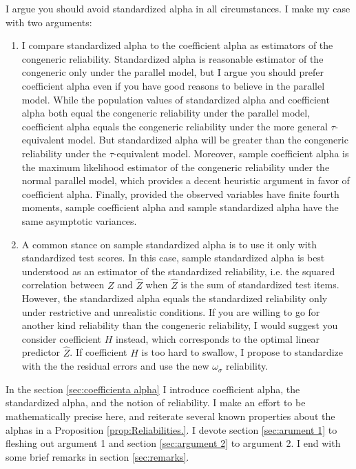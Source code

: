 \documentclass{article}
\theoremstyle{plain}
\theoremstyle{plain}
\theoremstyle{definition}
\theoremstyle{remark}
\theoremstyle{definition}
\theoremstyle{plain}
\theoremstyle{plain}
\theoremstyle{definition}
\begin{document}
I argue you should avoid standardized alpha in all circumstances. I make my case with two arguments:

\begin{enumerate}[label=\arabic*.]
\item I compare standardized alpha to the coefficient alpha as estimators of the congeneric reliability. Standardized alpha is reasonable estimator of the congeneric only under the parallel model, but I argue you should prefer coefficient alpha even if you have good reasons to believe in the parallel model. While the population values of standardized alpha and coefficient alpha both equal the congeneric reliability under the parallel model, coefficient alpha equals the congeneric reliability under the more general $\tau$-equivalent model. But standardized alpha will be greater than the congeneric reliability under the $\tau$-equivalent model. Moreover, sample coefficient alpha is the maximum likelihood estimator of the congeneric reliability under the normal parallel model, which provides a decent heuristic argument in favor of coefficient alpha. Finally, provided the observed variables have finite fourth moments, sample coefficient alpha and sample standardized alpha have the same asymptotic variances. 

\item A common stance on sample standardized alpha is to use it only with standardized test scores. In this case, sample standardized alpha is best understood as an estimator of the standardized reliability, i.e. the squared correlation between $Z$ and $\hat{Z}$ when $\hat{Z}$ is the sum of standardized test items. However, the standardized alpha equals the standardized reliability only under restrictive and unrealistic conditions. If you are willing to go for another kind reliability than the congeneric reliability, I would suggest you consider coefficient $H$ instead, which corresponds to the optimal linear predictor $\hat{Z}$. If coefficient $H$ is too hard to swallow, I propose to standardize with the the residual errors and use the new $\omega_\sigma$ reliability.
\end{enumerate}

In the section \ref{sec:coefficienta alpha} I introduce coefficient alpha, the standardized alpha, and the notion of reliability. I make an effort to be mathematically precise here, and reiterate several known properties about the alphas in a Proposition \ref{prop:Reliabilities.}. I devote section \ref{sec:arument 1} to fleshing out argument 1 and section \ref{sec:argument 2} to argument 2. I end with some brief remarks in section \ref{sec:remarks}.
\end{document}
